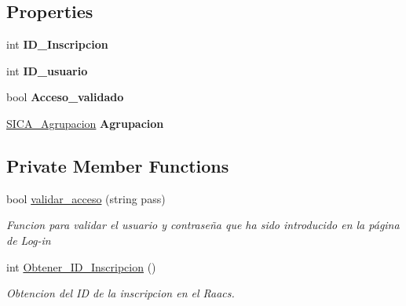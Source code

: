 \subsection*{Properties}
\begin{DoxyCompactItemize}
\item 
int {\bfseries I\+D\+\_\+\+Inscripcion}\hypertarget{class_sica_segura_1_1_s_i_c_a___libro_control_ae5ad33a04640bb7bfdbff7a84364dc85}{}\label{class_sica_segura_1_1_s_i_c_a___libro_control_ae5ad33a04640bb7bfdbff7a84364dc85}

\item 
int {\bfseries I\+D\+\_\+usuario}\hypertarget{class_sica_segura_1_1_s_i_c_a___libro_control_a05cd46258455ca884f0c967382a7fdeb}{}\label{class_sica_segura_1_1_s_i_c_a___libro_control_a05cd46258455ca884f0c967382a7fdeb}

\item 
bool {\bfseries Acceso\+\_\+validado}\hypertarget{class_sica_segura_1_1_s_i_c_a___libro_control_acfbd4ea0f207ea05e7fb4b44ade26b4c}{}\label{class_sica_segura_1_1_s_i_c_a___libro_control_acfbd4ea0f207ea05e7fb4b44ade26b4c}

\item 
\hyperlink{class_sica_segura_1_1_s_i_c_a___agrupacion}{S\+I\+C\+A\+\_\+\+Agrupacion} {\bfseries Agrupacion}\hypertarget{class_sica_segura_1_1_s_i_c_a___libro_control_ae30e7d9c2f9c9797f2bcec738610fd48}{}\label{class_sica_segura_1_1_s_i_c_a___libro_control_ae30e7d9c2f9c9797f2bcec738610fd48}

\end{DoxyCompactItemize}
\subsection*{Private Member Functions}
\begin{DoxyCompactItemize}
\item 
bool \hyperlink{class_sica_segura_1_1_s_i_c_a___libro_control_a88c4993cd7ff80f4e977c1f69e4db550}{validar\+\_\+acceso} (string pass)
\begin{DoxyCompactList}\small\item\em Funcion para validar el usuario y contraseña que ha sido introducido en la página de Log-\/in \end{DoxyCompactList}\item 
int \hyperlink{class_sica_segura_1_1_s_i_c_a___libro_control_a65b0d0cac67ce138a2415cab66e77b52}{Obtener\+\_\+\+I\+D\+\_\+\+Inscripcion} ()
\begin{DoxyCompactList}\small\item\em Obtencion del ID de la inscripcion en el Raacs. \end{DoxyCompactList}\end{DoxyCompactItemize}
